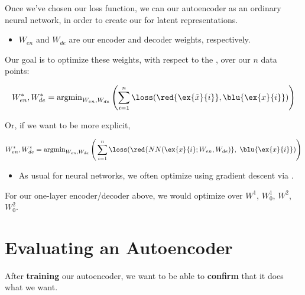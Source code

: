     \begin{concept}
        Once we've chosen our loss function, we can  our autoencoder as an ordinary neural network, in order to create our  for latent representations.

        \begin{itemize}
            \item $W_{en}$ and $W_{de}$ are our encoder and decoder weights, respectively.

        \end{itemize}

        Our goal is to optimize these weights, with respect to the , over our $n$ data points:

        \begin{equation*}
            W_{en}^*, W_{de}^* =  \operatorname{argmin}_{W_{en}, W_{de}} 
            \Bigg( {\sum_{i=1}^n \loss(\red{\ex{\tilde{x}}{i}}, \blu{\ex{x}{i}})} \Bigg)
        \end{equation*}
        
        Or, if we want to be more explicit,

        \begin{equation*}
            W_{en}^*, W_{de}^* = \operatorname{argmin}_{W_{en}, W_{de}} 
            \Bigg( \sum_{i=1}^n 
            \loss( \red{NN(\ex{x}{i}; W_{en},W_{de})} ,\; \blu{\ex{x}{i}}) 
            \Bigg)
        \end{equation*}

        \subsecdiv

        \begin{itemize}
            \item As usual for neural networks, we often optimize using gradient descent via .
        \end{itemize}
    \end{concept}


        \miniex For our one-layer encoder/decoder above, we would optimize over $W^1$, $W^1_0$, $W^2$, $W^2_0$.

    
\pagebreak
\section{Evaluating an Autoencoder}

    After \textbf{training} our autoencoder, we want to be able to \textbf{confirm} that it does what we want.

